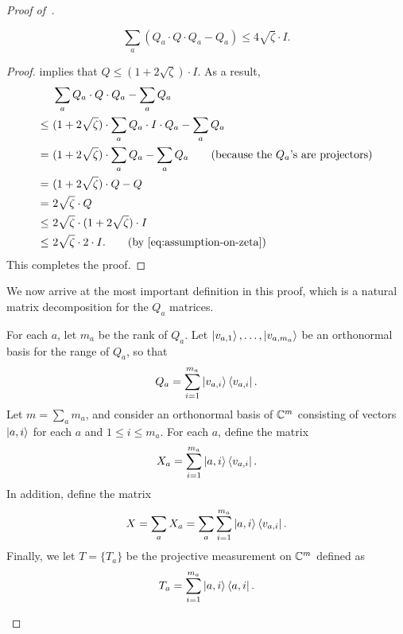 \begin{proof}[Proof of~]
\begin{lemma}\label{lem:q-almost-projective}
\begin{equation*}
\sum_a (Q_a \cdot Q  \cdot Q_a - Q_a) \leq  4\sqrt{\zeta} \cdot I.
\end{equation*}
\end{lemma}
\begin{proof}
 implies that $Q \leq (1 + 2\sqrt{\zeta}) \cdot I$. As a result,
\begin{align*}
&\sum_a Q_a \cdot Q  \cdot Q_a - \sum_a Q_a\\
\leq ~&(1 + 2\sqrt{\zeta}) \cdot \sum_a Q_a \cdot I  \cdot Q_a - \sum_a Q_a \\
= ~&(1+2\sqrt{\zeta}) \cdot \sum_a  Q_a - \sum_a Q_a \tag{because the $Q_a$'s are projectors}\\
= ~&(1+2\sqrt{\zeta}) \cdot Q - Q\\
= ~& 2\sqrt{\zeta} \cdot Q\\
\leq~& 2\sqrt{\zeta} \cdot (1 + 2\sqrt{\zeta}) \cdot I\\
\leq~& 2 \sqrt{\zeta} \cdot 2 \cdot I. \tag{by \Cref{eq:assumption-on-zeta}}
\end{align*}
This completes the proof.
\end{proof}

We now arrive at the most important definition in this proof,
which is a natural matrix decomposition for the $Q_a$ matrices.

\begin{definition}
For each $a$, let $m_a$ be the rank of $Q_a$.
Let $\ket{v_{a, 1}}, \ldots, \ket{v_{a, m_a}}$ be an orthonormal basis for the range of $Q_a$, so that
\begin{equation*}
Q_a = \sum_{i=1}^{m_a} \ket{v_{a, i}}\bra{v_{a,i}}.
\end{equation*}
Let $m = \sum_a m_a$, and consider an orthonormal basis of $\mathbb C^m$ consisting of vectors $\ket{a, i}$ for each $a$ and $1 \leq i \leq m_a$.
For each $a$, define the matrix
\begin{equation*}
X_a = \sum_{i=1}^{m_a} \ket{a, i} \bra{v_{a, i}}.
\end{equation*}
In addition, define the matrix
\begin{equation}\label{eq:looks-like-singular-value-decomposition}
X = \sum_a X_a =  \sum_a \sum_{i=1}^{m_a} \ket{a, i} \bra{v_{a, i}}.
\end{equation}
Finally, we let $T = \{T_a\}$ be the projective measurement on $\mathbb C^m$ defined as
\begin{equation*}
T_a = \sum_{i=1}^{m_a} \ket{a, i}\bra{a, i}.
\end{equation*}
\end{definition}


\end{proof}
